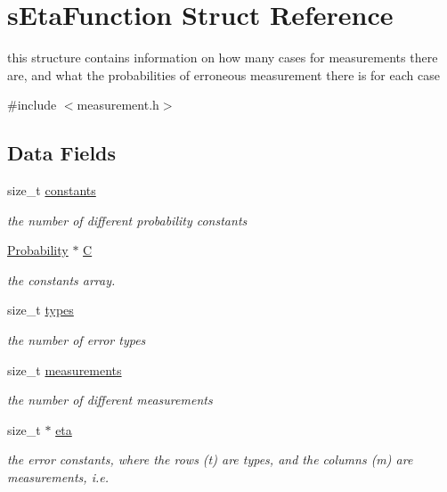 \hypertarget{structsEtaFunction}{\section{s\-Eta\-Function \-Struct \-Reference}
\label{structsEtaFunction}
}


this structure contains information on how many cases for measurements there are, and what the probabilities of erroneous measurement there is for each case  




{\ttfamily \#include $<$measurement.\-h$>$}

\subsection*{\-Data \-Fields}
\begin{DoxyCompactItemize}
\item 
size\-\_\-t \hyperlink{structsEtaFunction_a1fdf63f3a73e7fd663491e72421619f9}{constants}
\begin{DoxyCompactList}\small\item\em the number of different probability constants \end{DoxyCompactList}\item 
\hyperlink{common_2measurement_8h_ae6d7a8c80f18bc080ab1cfa38d119724}{\-Probability} $\ast$ \hyperlink{structsEtaFunction_a05c2f93c1148d5268d359d78540c10be}{\-C}
\begin{DoxyCompactList}\small\item\em the constants array. \end{DoxyCompactList}\item 
size\-\_\-t \hyperlink{structsEtaFunction_afd94a9856047e0987c5e8667a4838b71}{types}
\begin{DoxyCompactList}\small\item\em the number of error types \end{DoxyCompactList}\item 
size\-\_\-t \hyperlink{structsEtaFunction_aa323ef11935cd1e8d6ef56405ab96cf8}{measurements}
\begin{DoxyCompactList}\small\item\em the number of different measurements \end{DoxyCompactList}\item 
size\-\_\-t $\ast$ \hyperlink{structsEtaFunction_a7585a59b1861523157055f8c8b0263e3}{eta}
\begin{DoxyCompactList}\small\item\em the error constants, where the rows (t) are types, and the columns (m) are measurements, i.\-e. \end{DoxyCompactList}\end{DoxyCompactItemize}


